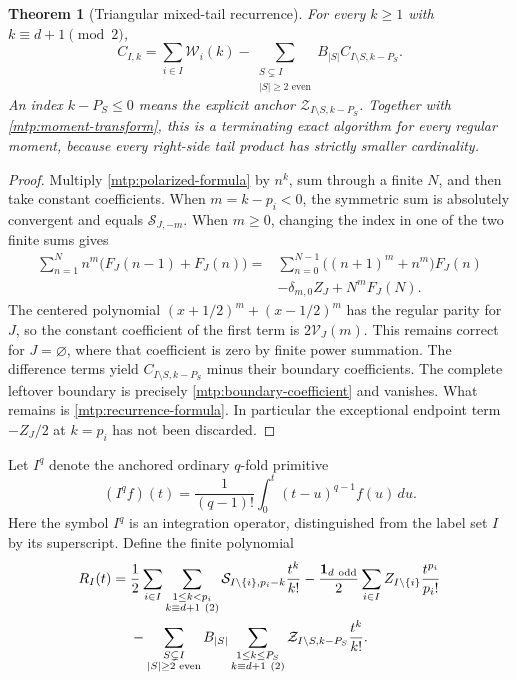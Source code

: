 \documentclass[11pt,letterpaper]{article}
\numberwithin{equation}{section}
\newtheorem{theorem}{Theorem}[section]
\theoremstyle{definition}
\theoremstyle{remark}
\begin{document}
\begin{theorem}[Triangular mixed-tail recurrence]
\label{mtp:recurrence}
For every $k\ge1$ with $k\equiv d+1\pmod2$,
\begin{equation}\label{mtp:recurrence-formula}
 \boxed{C_{I,k}=\sum_{i\in I}\mathcal W_i(k)
    -\sum_{\substack{S\subsetneq I\\|S|\ge2\text{ even}}}
                     B_{|S|}C_{I\setminus S,k-P_S}.}
\end{equation}
An index $k-P_S\le0$ means the explicit anchor
$\mathcal Z_{I\setminus S,k-P_S}$. Together with
\eqref{mtp:moment-transform}, this is a terminating exact algorithm
for every regular moment, because every right-side tail product has
strictly smaller cardinality.
\end{theorem}

\begin{proof}
Multiply \eqref{mtp:polarized-formula} by $n^k$, sum through a finite
$N$, and then take constant coefficients. When $m=k-p_i<0$, the
symmetric sum is absolutely convergent and equals
$\mathcal S_{J,-m}$. When $m\ge0$, changing the index in one of the
two finite sums gives
\begin{align*}
 \sum_{n=1}^N n^m\bigl(F_J(n-1)+F_J(n)\bigr)
 ={}&\sum_{n=0}^{N-1}\bigl((n+1)^m+n^m\bigr)F_J(n)\\
    &-\delta_{m,0}Z_J+N^mF_J(N).
\end{align*}
The centered polynomial $(x+1/2)^m+(x-1/2)^m$ has the regular parity
for $J$, so the constant coefficient of the first term is
$2\mathcal V_J(m)$. This remains correct for $J=\varnothing$, where
that coefficient is zero by finite power summation.
The difference terms yield $C_{I\setminus S,k-P_S}$ minus their
boundary coefficients. The complete leftover boundary is precisely
\eqref{mtp:boundary-coefficient} and vanishes. What remains is
\eqref{mtp:recurrence-formula}. In particular the exceptional endpoint
term $-Z_J/2$ at $k=p_i$ has not been discarded.
\end{proof}

Let $I^q$ denote the anchored ordinary $q$-fold primitive
\[
 (I^qf)(t)=\frac1{(q-1)!}\int_0^t(t-u)^{q-1}f(u)\,du.
\]
Here the symbol $I^q$ is an integration operator, distinguished from
the label set $I$ by its superscript. Define the finite polynomial
\begin{align}
 R_I(t)={}&\frac12\sum_{i\in I}
       \sum_{\substack{1\le k<p_i\\k\equiv d+1\ (2)}}
          \mathcal S_{I\setminus\{i\},p_i-k}\frac{t^k}{k!}
       -\frac{\mathbf1_{d\ \mathrm{odd}}}{2}
          \sum_{i\in I}Z_{I\setminus\{i\}}\frac{t^{p_i}}{p_i!}
       \notag\\
 &-\sum_{\substack{S\subsetneq I\\|S|\ge2\text{ even}}}B_{|S|}
       \sum_{\substack{1\le k\le P_S\\k\equiv d+1\ (2)}}
          \mathcal Z_{I\setminus S,k-P_S}\frac{t^k}{k!}.
       \label{mtp:R}
\end{align}
\end{document}
